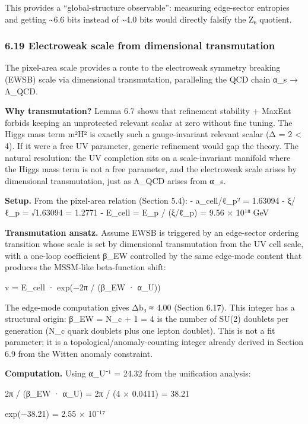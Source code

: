 \documentclass[
]{article}
\begin{document}
This provides a ``global-structure observable'': measuring edge-sector
entropies and getting \textasciitilde6.6 bits instead of
\textasciitilde4.0 bits would directly falsify the Z₆ quotient.

\subsubsection{6.19 Electroweak scale from dimensional
transmutation}\label{electroweak-scale-from-dimensional-transmutation}

The pixel-area scale provides a route to the electroweak symmetry
breaking (EWSB) scale via dimensional transmutation, paralleling the QCD
chain α\_s → Λ\_QCD.

\textbf{Why transmutation?} Lemma 6.7 shows that refinement stability +
MaxEnt forbids keeping an unprotected relevant scalar at zero without
fine tuning. The Higgs mass term m²\textbar H\textbar² is exactly such a
gauge-invariant relevant scalar (Δ = 2 \textless{} 4). If it were a free
UV parameter, generic refinement would gap the theory. The natural
resolution: the UV completion sits on a scale-invariant manifold where
the Higgs mass term is not a free parameter, and the electroweak scale
arises by dimensional transmutation, just as Λ\_QCD arises from α\_s.

\textbf{Setup.} From the pixel-area relation (Section 5.4): -
a\_cell/ℓ\_p² = 1.63094 - ξ/ℓ\_p = √1.63094 = 1.2771 - E\_cell = E\_p /
(ξ/ℓ\_p) = 9.56 × 10¹⁸ GeV

\textbf{Transmutation ansatz.} Assume EWSB is triggered by an
edge-sector ordering transition whose scale is set by dimensional
transmutation from the UV cell scale, with a one-loop coefficient β\_EW
controlled by the same edge-mode content that produces the MSSM-like
beta-function shift:

v = E\_cell · exp(−2π / (β\_EW · α\_U))

The edge-mode computation gives Δb₃ ≈ 4.00 (Section 6.17). This integer
has a structural origin: β\_EW = N\_c + 1 = 4 is the number of SU(2)
doublets per generation (N\_c quark doublets plus one lepton doublet).
This is not a fit parameter; it is a topological/anomaly-counting
integer already derived in Section 6.9 from the Witten anomaly
constraint.

\textbf{Computation.} Using α\_U⁻¹ = 24.32 from the unification
analysis:

2π / (β\_EW · α\_U) = 2π / (4 × 0.0411) = 38.21

exp(−38.21) = 2.55 × 10⁻¹⁷
\end{document}
